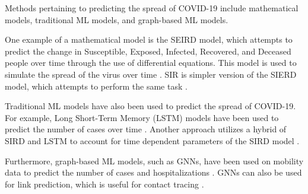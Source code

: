 \documentclass[times, 10pt,twocolumn]{article}
\begin{document}

Methods pertaining to predicting the spread of COVID-19 include mathematical models, traditional ML models, and graph-based ML models. 

One example of a mathematical model is the SEIRD model, which attempts to predict the change in Susceptible, Exposed, Infected, Recovered, and Deceased people over time through the use of differential equations. This model is used to simulate the spread of the virus over time \cite{SEIRD-LSTM}.
SIR is simpler version of the SIERD model, which attempts to perform the same task \cite{SIR}.

Traditional ML models have also been used to predict the spread of COVID-19. For example, Long Short-Term Memory (LSTM) models have been used to predict the number of cases over time \cite{SEIRD-LSTM}. 
Another approach utilizes a hybrid of SIRD and LSTM to account for time dependent parameters of the SIRD model \cite{SIRD-LSTM-hybrid}.

Furthermore, graph-based ML models, such as GNNs, have been used on mobility data to predict the number of cases and hospitalizations \cite{positivity-hospitalization-GNN}.
GNNs can also be used for link prediction, which is useful for contact tracing \cite{contact-tracing-GNN}\cite{link-prediction-GNN}. 



\end{document}
